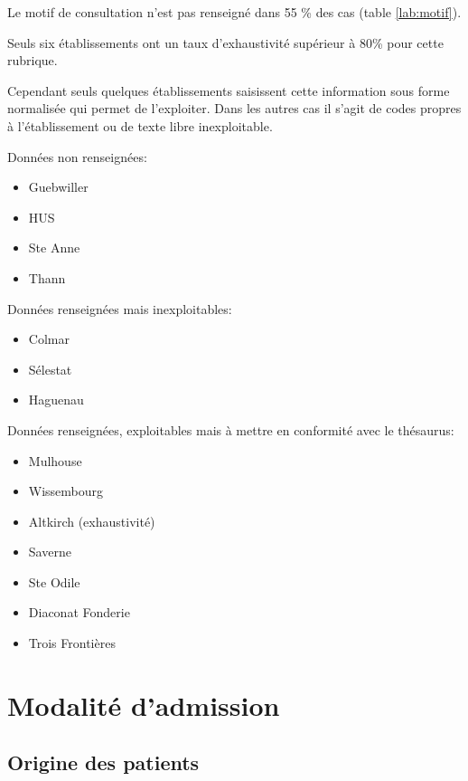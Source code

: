 \documentclass[12pt,english,french,twoside]{book}\usepackage[]{graphicx}\usepackage[]{color}
\begin{document}
Le motif de consultation n'est pas renseigné dans 55 \% des cas (table \ref{lab:motif}).

Seuls six établissements ont un taux d'exhaustivité supérieur à 80\% pour cette rubrique.

Cependant seuls quelques établissements saisissent cette information sous forme normalisée qui permet de l'exploiter. Dans les autres cas il s'agit de codes propres à l'établissement ou de texte libre inexploitable.

Données non renseignées:
\begin{itemize}
  \item Guebwiller
  \item HUS
  \item Ste Anne
  \item Thann
\end{itemize}

Données renseignées mais inexploitables:
\begin{itemize}
  \item Colmar
  \item Sélestat
  \item Haguenau
\end{itemize}

Données renseignées, exploitables mais à mettre en conformité avec le thésaurus:
\begin{itemize}
  \item Mulhouse
  \item Wissembourg
  \item Altkirch (exhaustivité)
  \item Saverne
  \item Ste Odile
  \item Diaconat Fonderie
  \item Trois Frontières
\end{itemize}

\newpage
\chapter{Modalité d'admission}



\section*{Origine des patients}
\end{document}
